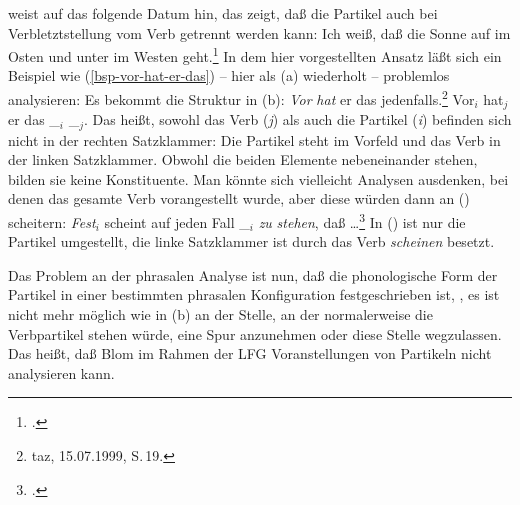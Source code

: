 \citet*[]{Luedeling2001a} weist auf das folgende Datum hin, das zeigt, daß die Partikel
auch bei Verbletztstellung vom Verb getrennt werden kann:
\ea
\label{ex-auf-im-osten-geht}
Ich weiß, daß die Sonne auf              im     Osten und unter               im     Westen geht.\footnote{
        .%
}
\z
In dem hier vorgestellten Ansatz läßt sich ein Beispiel wie (\ref{bsp-vor-hat-er-das})
-- hier als (a) wiederholt -- problemlos analysieren: Es bekommt die Struktur in (b):
\eal
\ex \label{bsp-vor-hat-er-das-zwei}
\emph{Vor\/} \emph{hat\/} er das jedenfalls.\footnote{
taz, 15.07.1999, S.\,19.
}
\ex Vor$_i$ hat$_j$ er das \_$_i$ \_$_j$.
\zl
Das heißt, sowohl das Verb (\emph{j}) als auch die Partikel (\emph{i}) befinden
sich nicht in der rechten Satzklammer: Die Partikel steht im Vorfeld und das Verb
in der linken Satzklammer. Obwohl die beiden Elemente nebeneinander stehen, bilden
sie keine Konstituente. Man könnte sich vielleicht Analysen ausdenken, bei denen
das gesamte Verb vorangestellt wurde, aber diese würden dann an () scheitern:
\ea 
\emph{Fest}$_i$ scheint auf jeden Fall \_$_i$ \emph{zu} {\em stehen}, daß \ldots\footnote{
        .
       }
\z
In () ist nur die Partikel umgestellt, die linke Satzklammer ist durch das Verb \emph{scheinen}
besetzt.

Das Problem an der phrasalen Analyse ist nun, daß die phonologische Form der Partikel in einer bestimmten
phrasalen Konfiguration festgeschrieben ist, \dash, es ist nicht mehr möglich wie in (b)
an der Stelle, an der normalerweise die Verbpartikel stehen würde, eine Spur anzunehmen
oder diese Stelle wegzulassen. Das heißt, daß Blom im Rahmen der LFG Voranstellungen
von Partikeln nicht analysieren kann.

